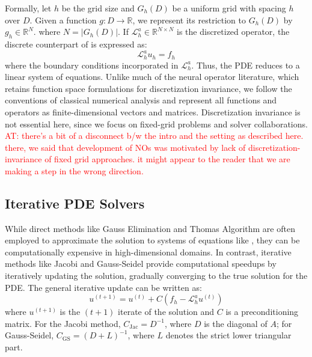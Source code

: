 \documentclass{article} %
\newcommand\ambuj[1]{\textcolor{red}{AT: #1}}
\begin{document}
Formally, let $h$ be the grid size and $G_h(D)$ be a uniform grid with spacing $h$ over $D$. Given a function $g: D \to \mathbb{R}$, we represent its restriction to $G_h(D)$ by $g_h \in \mathbb{R}^N$.
where $N = |G_h(D)|$. If $\mathcal{L}_h^a \in \mathbb{R}^{N \times N}$ is the discretized operator, the discrete counterpart of  is expressed as:
\begin{equation} \label{eq:mainpdediscrete}
    \mathcal{L}_h^au_h = f_h
\end{equation}
where the boundary conditions incorporated in $\mathcal{L}_h^a$. Thus, the PDE reduces to a linear system of equations. Unlike much of the neural operator literature, which retains function space formulations for discretization invariance, we follow the conventions of classical numerical analysis and represent all functions and operators as finite-dimensional vectors and matrices. Discretization invariance is not essential here, since we focus on fixed-grid problems and solver collaborations. \ambuj{there's a bit of a disconnect b/w the intro and the setting as described here. there, we said that development of NOs was motivated by lack of discretization-invariance of fixed grid approaches. it might appear to the reader that we are making a step in the wrong direction.}

\subsection{Iterative PDE Solvers} \label{sec:finitedifference}

While direct methods like Gauss Elimination and Thomas Algorithm are often employed to approximate the solution to systems of equations like , they can be computationally expensive in high-dimensional domains. In contrast, iterative methods like Jacobi and Gauss-Seidel provide computational speedups by iteratively updating the solution, gradually converging to the true solution for the PDE. The general iterative update can be written as:
\begin{equation}\label{eq:iterativeupdate}
    u^{(t + 1)} = u^{(t)} + C\left(f_h - \mathcal{L}_h^au^{(t)}\right)
\end{equation}
where $u^{(t + 1)}$ is the $(t + 1)$ iterate of the solution and $C$ is a preconditioning matrix. For the Jacobi method, $C_\mathrm{Jac} = D^{-1}$, where $D$ is the diagonal of $A$; for Gauss-Seidel, $C_\mathrm{GS} = (D + L)^{-1}$, where $L$ denotes the strict lower triangular part. 
\end{document}
